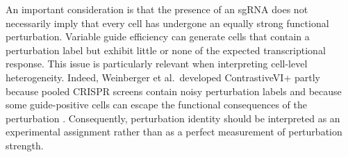 \documentclass[11pt,a4paper]{article}
\begin{document}
An important consideration is that the presence of an sgRNA does not
necessarily imply that every cell has undergone an equally strong functional
perturbation. Variable guide efficiency can generate cells that contain a
perturbation label but exhibit little or none of the expected transcriptional
response. This issue is particularly relevant when interpreting cell-level
heterogeneity. Indeed, Weinberger et al.\ developed ContrastiveVI+ partly
because pooled CRISPR screens contain noisy perturbation labels and because
some guide-positive cells can escape the functional consequences of the
perturbation \cite{weinberger2024}. Consequently, perturbation identity should
be interpreted as an experimental assignment rather than as a perfect
measurement of perturbation strength.

%
%
%
%
%
\end{document}
